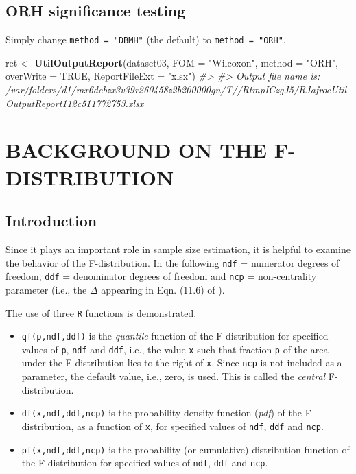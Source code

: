 \documentclass[]{book}
\newenvironment{Shaded}{\begin{snugshade}}{\end{snugshade}}
\newcommand{\CommentTok}[1]{\textcolor[rgb]{0.56,0.35,0.01}{\textit{#1}}}
\newcommand{\DataTypeTok}[1]{\textcolor[rgb]{0.13,0.29,0.53}{#1}}
\newcommand{\KeywordTok}[1]{\textcolor[rgb]{0.13,0.29,0.53}{\textbf{#1}}}
\newcommand{\NormalTok}[1]{#1}
\newcommand{\OtherTok}[1]{\textcolor[rgb]{0.56,0.35,0.01}{#1}}
\newcommand{\StringTok}[1]{\textcolor[rgb]{0.31,0.60,0.02}{#1}}
\begin{document}
\hypertarget{orh-significance-testing-1}{%
\section{ORH significance testing}\label{orh-significance-testing-1}}

Simply change \texttt{method\ =\ "DBMH"} (the default) to \texttt{method\ =\ "ORH"}.

\begin{Shaded}
\begin{Highlighting}[]
\NormalTok{ret <-}\StringTok{ }\KeywordTok{UtilOutputReport}\NormalTok{(dataset03, }\DataTypeTok{FOM =} \StringTok{"Wilcoxon"}\NormalTok{, }\DataTypeTok{method =} \StringTok{"ORH"}\NormalTok{, }\DataTypeTok{overWrite =} \OtherTok{TRUE}\NormalTok{, }\DataTypeTok{ReportFileExt =} \StringTok{"xlsx"}\NormalTok{)}
\CommentTok{#> }
\CommentTok{#> Output file name is:      /var/folders/d1/mx6dcbzx3v39r260458z2b200000gn/T//RtmpICzgJ5/RJafrocUtilOutputReport112c511772753.xlsx}
\end{Highlighting}
\end{Shaded}

\hypertarget{SSFDistr}{%
\chapter{BACKGROUND ON THE F-DISTRIBUTION}\label{SSFDistr}}

\hypertarget{introduction-6}{%
\section{Introduction}\label{introduction-6}}

Since it plays an important role in sample size estimation, it is helpful to examine the behavior of the F-distribution. In the following \texttt{ndf} = numerator degrees of freedom, \texttt{ddf} = denominator degrees of freedom and \texttt{ncp} = non-centrality parameter (i.e., the \(\Delta\) appearing in Eqn. (11.6) of \citep{RN2680}).

The use of three \texttt{R} functions is demonstrated.

\begin{itemize}
\item
  \texttt{qf(p,ndf,ddf)} is the \emph{quantile} function of the F-distribution for specified values of \texttt{p}, \texttt{ndf} and \texttt{ddf}, i.e., the value \texttt{x} such that fraction \texttt{p} of the area under the F-distribution lies to the right of \texttt{x}. Since \texttt{ncp} is not included as a parameter, the default value, i.e., zero, is used. This is called the \emph{central} F-distribution.
\item
  \texttt{df(x,ndf,ddf,ncp)} is the probability density function (\emph{pdf}) of the F-distribution, as a function of \texttt{x}, for specified values of \texttt{ndf}, \texttt{ddf} and \texttt{ncp}.
\item
  \texttt{pf(x,ndf,ddf,ncp)} is the probability (or cumulative) distribution function of the F-distribution for specified values of \texttt{ndf}, \texttt{ddf} and \texttt{ncp}.
\end{itemize}
\end{document}
